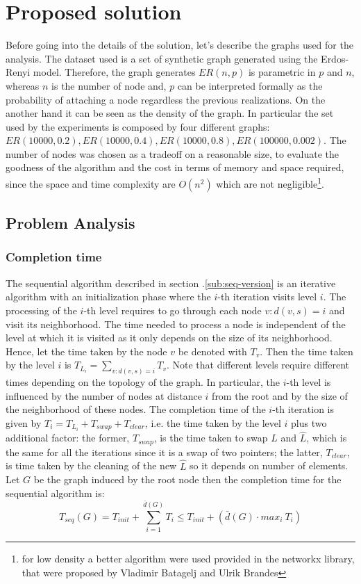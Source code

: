 \section{Proposed solution}
Before going into the details of the solution, let's describe the graphs 
used for the analysis. The dataset used is a set of synthetic 
graph generated using the Erdos-Renyi model.
Therefore, the graph generates $ER(n, p)$ is parametric in $p$ and $n$, whereas $n$ is the number of node and, $p$ can be interpreted formally as the probability
of attaching a node regardless the previous realizations.  On the another hand it
can be seen as the density of the graph. In particular the set used by the experiments
is composed by four different graphs: $ER(10000, 0.2), ER(10000, 0.4), ER(10000, 0.8), ER(100000, 0.002)$. 
The number of nodes was chosen as a tradeoff on a reasonable size, to evaluate the
goodness of the algorithm and the cost in terms of memory and space required, since
the space and time complexity are $O(n^2)$ which are not negligible\footnote{for low density a better algorithm were used provided in the networkx library, that were proposed by Vladimir Batagelj and Ulrik Brandes\cite{PhysRevE.71.036113}}.
\subsection{Problem Analysis}
\subsubsection{Completion time}
\label{sec:comp-time}
The sequential algorithm described in section .\ref{sub:seq-version} is an
iterative algorithm with an initialization phase where the $i$-th iteration visits level $i$. The
processing of the $i$-th level requires to go through each node
$v : d(v, s) = i$ and visit its neighborhood.
The time needed to process a node is independent of the
level at which it is visited as it only depends on the size
of its neighborhood. Hence, let the time taken by the node $v$ be denoted 
with $T_v$. Then the time taken by the level $i$ is $T_{L_i} = \sum_{v : d(v, s) = i}T_v$.
Note that different levels require different times depending on the topology of the graph. In particular, the $i$-th level is influenced by the number of nodes at distance $i$ from the root 
and by the size of the neighborhood of these nodes. The completion time of the $i$-th
iteration is given by $T_i = T_{L_i} + T_{swap} + T_{clear}$, i.e. the time taken by the level $i$ plus two additional factor: the former, $T_{swap}$, is the time taken to swap 
$L$ and $\hat{L}$, which is the same for all the iterations since it is a swap of two pointers; the latter, $T_{clear}$, is
time taken by the cleaning of the new $\hat{L}$ so it depends on number of elements.
Let $G$ be the graph induced by the root node then the completion time for the sequential algorithm is:
$$
T_{seq}(G) = T_{init} + \sum^{\bar{d}(G)}_{i=1} T_i \leq  T_{init} + (\bar{d}(G) \cdot max_i \ T_i)
$$

